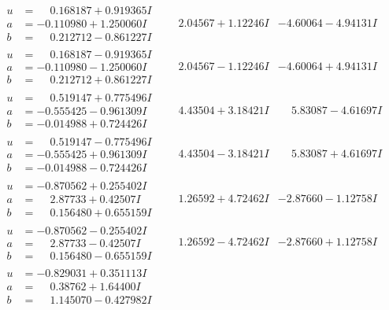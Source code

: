 \documentclass[1p]{elsarticle_modified}
\theoremstyle{definition}
\begin{document}
$$\begin{array}{c|c|c}
\begin{aligned}
u &= \phantom{-}0.168187 + 0.919365 I \\
a &= -0.110980 + 1.250060 I \\
b &= \phantom{-}0.212712 - 0.861227 I\end{aligned}
 & \phantom{-}2.04567 + 1.12246 I & -4.60064 - 4.94131 I \\ \hline\begin{aligned}
u &= \phantom{-}0.168187 - 0.919365 I \\
a &= -0.110980 - 1.250060 I \\
b &= \phantom{-}0.212712 + 0.861227 I\end{aligned}
 & \phantom{-}2.04567 - 1.12246 I & -4.60064 + 4.94131 I \\ \hline\begin{aligned}
u &= \phantom{-}0.519147 + 0.775496 I \\
a &= -0.555425 - 0.961309 I \\
b &= -0.014988 + 0.724426 I\end{aligned}
 & \phantom{-}4.43504 + 3.18421 I & \phantom{-}5.83087 - 4.61697 I \\ \hline\begin{aligned}
u &= \phantom{-}0.519147 - 0.775496 I \\
a &= -0.555425 + 0.961309 I \\
b &= -0.014988 - 0.724426 I\end{aligned}
 & \phantom{-}4.43504 - 3.18421 I & \phantom{-}5.83087 + 4.61697 I \\ \hline\begin{aligned}
u &= -0.870562 + 0.255402 I \\
a &= \phantom{-}2.87733 + 0.42507 I \\
b &= \phantom{-}0.156480 + 0.655159 I\end{aligned}
 & \phantom{-}1.26592 + 4.72462 I & -2.87660 - 1.12758 I \\ \hline\begin{aligned}
u &= -0.870562 - 0.255402 I \\
a &= \phantom{-}2.87733 - 0.42507 I \\
b &= \phantom{-}0.156480 - 0.655159 I\end{aligned}
 & \phantom{-}1.26592 - 4.72462 I & -2.87660 + 1.12758 I \\ \hline\begin{aligned}
u &= -0.829031 + 0.351113 I \\
a &= \phantom{-}0.38762 + 1.64400 I \\
b &= \phantom{-}1.145070 - 0.427982 I\end{aligned}

\end{array}$$
\end{document}
